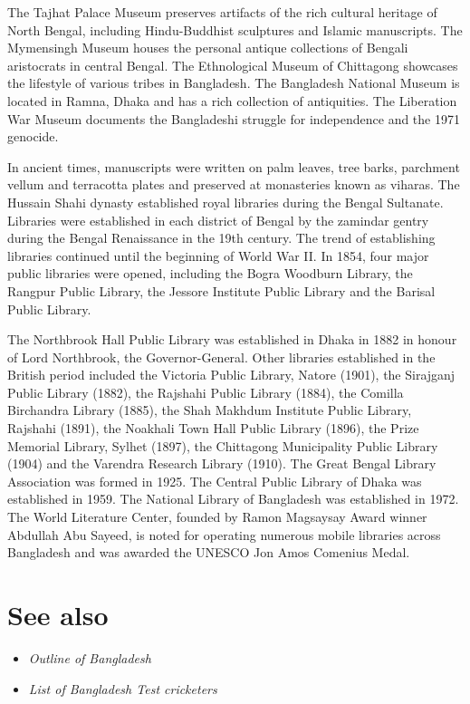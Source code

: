 The Tajhat Palace Museum preserves artifacts of the rich cultural
heritage of North Bengal, including Hindu-Buddhist sculptures and
Islamic manuscripts. The Mymensingh Museum houses the personal antique
collections of Bengali aristocrats in central Bengal. The Ethnological
Museum of Chittagong showcases the lifestyle of various tribes in
Bangladesh. The Bangladesh National Museum is located in Ramna, Dhaka
and has a rich collection of antiquities. The Liberation War Museum
documents the Bangladeshi struggle for independence and the 1971
genocide.

In ancient times, manuscripts were written on palm leaves, tree barks,
parchment vellum and terracotta plates and preserved at monasteries
known as viharas. The Hussain Shahi dynasty established royal libraries
during the Bengal Sultanate. Libraries were established in each district
of Bengal by the zamindar gentry during the Bengal Renaissance in the
19th century. The trend of establishing libraries continued until the
beginning of World War II. In 1854, four major public libraries were
opened, including the Bogra Woodburn Library, the Rangpur Public
Library, the Jessore Institute Public Library and the Barisal Public
Library.

The Northbrook Hall Public Library was established in Dhaka in 1882 in
honour of Lord Northbrook, the Governor-General. Other libraries
established in the British period included the Victoria Public Library,
Natore (1901), the Sirajganj Public Library (1882), the Rajshahi Public
Library (1884), the Comilla Birchandra Library (1885), the Shah Makhdum
Institute Public Library, Rajshahi (1891), the Noakhali Town Hall Public
Library (1896), the Prize Memorial Library, Sylhet (1897), the
Chittagong Municipality Public Library (1904) and the Varendra Research
Library (1910). The Great Bengal Library Association was formed in 1925.
The Central Public Library of Dhaka was established in 1959. The
National Library of Bangladesh was established in 1972. The World
Literature Center, founded by Ramon Magsaysay Award winner Abdullah Abu
Sayeed, is noted for operating numerous mobile libraries across
Bangladesh and was awarded the UNESCO Jon Amos Comenius Medal.

\section{See also}\label{see-also}

\begin{itemize}
\item
  \emph{Outline of Bangladesh}
\item
  \emph{List of Bangladesh Test cricketers}
\end{itemize}

